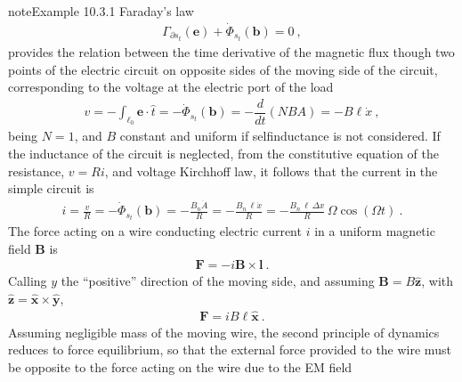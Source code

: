 \documentclass[letterpaper,10pt,english]{jupyterBook}
\begin{document}
\begin{sphinxadmonition}{note}{Example 10.3.1}
\sphinxAtStartPar
{} Faraday’s law
\begin{equation*}
\begin{split}\Gamma_{\partial s_t}(\mathbf{e}) + \dot{\Phi}_{s_t}(\mathbf{b}) = 0 \ ,\end{split}
\end{equation*}
\sphinxAtStartPar
provides the relation between the time derivative of the magnetic flux though two points of the electric circuit on opposite sides of the moving side of the circuit, corresponding to the voltage at the electric port of the load
\begin{equation*}
\begin{split}v = - \int_{\ell_0} \mathbf{e} \cdot \hat{t} = - \dot{\Phi}_{s_t}(\mathbf{b}) = - \dfrac{d}{dt} \left( N B A \right) = - B \ell \dot{x} \ ,\end{split}
\end{equation*}
\sphinxAtStartPar
being \(N = 1\), and \(B\) constant and uniform if self\sphinxhyphen{}inductance is not considered.
If the inductance of the circuit is neglected, from the constitutive equation of the resistance, \(v = R i\), and voltage Kirchhoff law, it follows that the current in the simple circuit is
\begin{equation*}
\begin{split}i = \frac{v}{R} = - \dot{\Phi}_{s_t}(\mathbf{b}) = - \frac{B_n \dot{A}}{R} = - \frac{B_n \, \ell \dot{x}}{R} = - \frac{B_n \, \ell \, \Delta x}{R} \, \Omega \cos(\Omega t) \ .\end{split}
\end{equation*}
\sphinxAtStartPar
The force acting on a wire conducting electric current \(i\) in a uniform magnetic field \(\mathbf{B}\) is
\begin{equation*}
\begin{split}\mathbf{F} = - i \mathbf{B} \times \mathbf{l} \ .\end{split}
\end{equation*}
\sphinxAtStartPar
Calling \(y\) the “positive” direction of the moving side, and assuming \(\mathbf{B} = B \hat{\mathbf{z}}\), with \(\hat{\mathbf{z}} = \hat{\mathbf{x}} \times \hat{\mathbf{y}}\),
\begin{equation*}
\begin{split}\mathbf{F} = i B \ell \hat{\mathbf{x}} \ .\end{split}
\end{equation*}
\sphinxAtStartPar
Assuming negligible mass of the moving wire, the second principle of dynamics reduces to force equilibrium, so that the external force provided to the wire must be opposite to the force acting on the wire due to the EM field

\end{sphinxadmonition}
\end{document}
